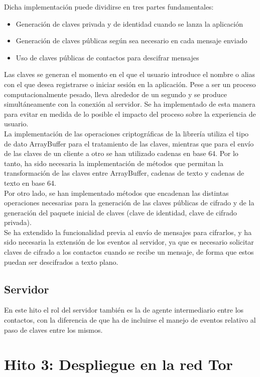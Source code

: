 Dicha implementación puede dividirse en tres partes fundamentales: 

\begin{itemize}
\item {Generación de claves privada y de identidad cuando se lanza la aplicación}
\item {Generación de claves públicas según sea necesario en cada mensaje enviado}
\item {Uso de claves públicas de contactos para descifrar mensajes}
\end{itemize}

Las claves se generan el momento en el que el usuario introduce el nombre o alias con el que desea registrarse o iniciar sesión en la aplicación. Pese a ser un proceso computacionalmente pesado, lleva alrededor de un segundo y se produce simultáneamente con la conexión al servidor. Se ha implementado de esta manera para evitar en medida de lo posible el impacto del proceso sobre la experiencia de usuario. \\

La implementación de las operaciones criptográficas de la librería utiliza el tipo de dato ArrayBuffer para el tratamiento de las claves, mientras que para el envío de las claves de un cliente a otro se han utilizado cadenas en base 64. Por lo tanto, ha sido necesaria la implementación de métodos que permitan la transformación de las claves entre ArrayBuffer, cadenas de texto y cadenas de texto en base 64. \\

Por otro lado, se han implementado métodos que encadenan las distintas operaciones necesarias para la generación de las claves públicas de cifrado y de la generación del paquete inicial de claves (clave de identidad, clave de cifrado privada). \\

Se ha extendido la funcionalidad previa al envío de mensajes para cifrarlos, y ha sido necesaria la extensión de los eventos al servidor, ya que es necesario solicitar claves de cifrado a los contactos cuando se recibe un mensaje, de forma que estos puedan ser descifrados a texto plano.

\subsection{Servidor}

En este hito el rol del servidor también es la de agente intermediario entre los contactos, con la diferencia de que ha de incluirse el manejo de eventos relativo al paso de claves entre los mismos.

\section{Hito 3: Despliegue en la red Tor}



